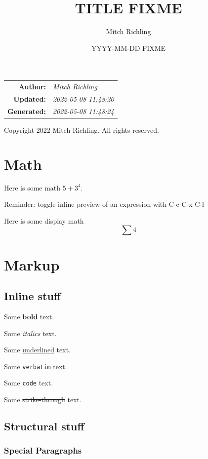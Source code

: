 \documentclass[11pt]{article}
\author{Mitch Richling}
\date{YYYY-MM-DD FIXME}
\title{TITLE FIXME}
\begin{document}
\maketitle
\begin{center}
\begin{tabular}{rl}
\textbf{Author:} & \emph{Mitch Richling}\\
\textbf{Updated:} & \emph{2022-05-08 11:48:20}\\
\textbf{Generated:} & \emph{2022-05-08 11:48:24}\\
\end{tabular}
\end{center}
Copyright 2022 Mitch Richling. All rights reserved.

\setcounter{tocdepth}{5}
\tableofcontents

\section{Math}
\label{sec:orgcba23b3}

Here is some math \(5+3^4\).

Reminder: toggle inline preview of an expression with C-c C-x C-l

Here is some display math $$\sum 4$$

\section{Markup}
\label{sec:org1776124}

\subsection{Inline stuff}
\label{sec:org161efae}

Some \textbf{bold} text.

Some \emph{italics} text.

Some \uline{underlined} text.

Some \texttt{verbatim} text.

Some \texttt{code} text.

Some \sout{strike-through} text.

\subsection{Structural stuff}
\label{sec:org1de6d92}

\subsubsection{Special Paragraphs}
\label{sec:org2138ffb}
\end{document}
